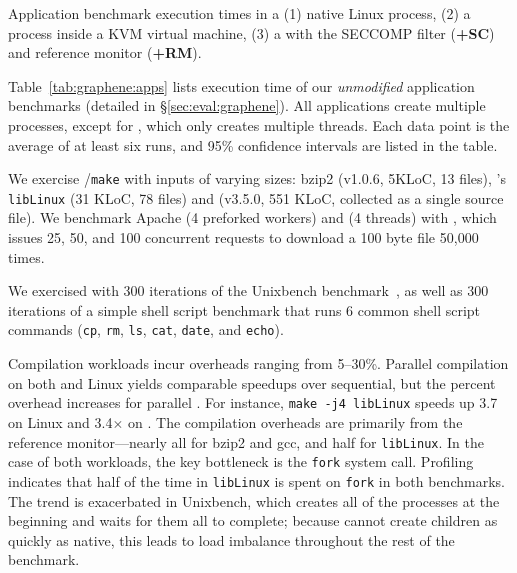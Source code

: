 \begin{table}[t!b!]

\caption{Application benchmark execution times in a (1) native Linux process, (2) a process inside a KVM virtual machine, (3) a \graphene{} \picoproc{} with the SECCOMP filter ({\bf +SC}) and reference monitor ({\bf +RM}). }
\label{tab:graphene:apps}
\end{table}



Table~\ref{tab:graphene:apps} lists 
execution time of our {\em unmodified} 
application benchmarks (detailed in \S\ref{sec:eval:graphene}).
All applications create multiple processes,
except for \lighttpd{}, which only creates multiple threads.
Each data point is the average of at least six runs, 
and 95\% confidence intervals are listed in the table.

We exercise  {\tt \gcc{}}/{\tt make}
with inputs of varying sizes:
bzip2 (v1.0.6, 5KLoC, 13 files),
\graphene{}'s {\tt libLinux} (31 KLoC, 78 files)
and \gcc{} (v3.5.0, 551 KLoC, collected as a single source file). 
We benchmark Apache (4 preforked workers) and \lighttpd{} (4 threads) with 
\ab{},
which issues 25, 50, and 100 concurrent requests
to download a 100 byte file 50,000 times.

We exercised \busy{} with 
300 iterations of the Unixbench benchmark~\cite{unixbench}, as well as 
300 iterations of a simple shell script benchmark that runs 6 common shell script commands
({\tt cp}, {\tt rm}, {\tt ls}, {\tt cat}, {\tt date}, and {\tt echo}).

Compilation workloads incur overheads ranging from 5--30\%.
Parallel compilation on both \graphene{} and Linux yields comparable  speedups  over sequential,
but the percent overhead increases for parallel \graphene{}.
For instance, {\tt make -j4 libLinux} speeds up 3.7\x{} on Linux and 3.4$\times$ on \graphene{}.
The compilation overheads are primarily from the reference monitor---nearly all for bzip2 and gcc, and half for {\tt libLinux}.
In the case of both \busy{} workloads, the key bottleneck is the {\tt fork} system call.
Profiling indicates that half of the time in {\tt libLinux} is spent on {\tt fork} in both benchmarks.
The trend is exacerbated in Unixbench, which creates all of the processes at the beginning and
waits for them all to complete; because \graphene{} cannot create children as quickly as native, this leads to 
load imbalance throughout the rest of the benchmark.  

